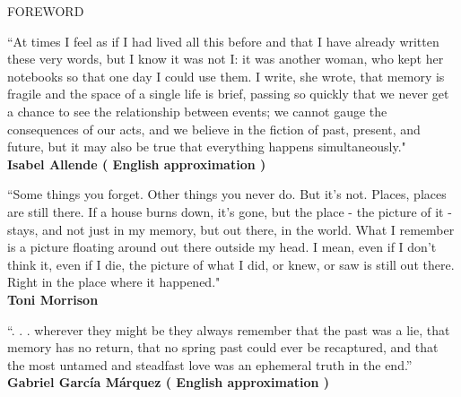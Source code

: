 \documentclass[11pt]{article}
\begin{document}
\vspace*{5\baselineskip}

\begingroup
\begin{center}
\huge FOREWORD
\end{center}
\endgroup

\vspace*{2\baselineskip}

\begingroup
\begin{center}
``At times I feel as if I had lived all this before and that I have already written these very words, but I know it was not I: it was another woman, who kept her notebooks so that one day I could use them. I write, she wrote, that memory is fragile and the space of a single life is brief, passing so quickly that we never get a chance to see the relationship between events; we cannot gauge the consequences of our acts, and we believe in the fiction of past, present, and future, but it may also be true that everything happens simultaneously." \\ \textbf{Isabel Allende ( English approximation )}
\end{center}
\endgroup

\begingroup
\begin{center}
``Some things you forget. Other things you never do. But it's not. Places, places are still there. If a house burns down, it's gone, but the place - the picture of it - stays, and not just in my memory, but out there, in the world. What I remember is a picture floating around out there outside my head. I mean, even if I don't think it, even if I die, the picture of what I did, or knew, or saw is still out there. Right in the place where it happened." \\ \textbf{Toni Morrison}
\end{center}
\endgroup

\begingroup
\begin{center}
``. . . wherever they might be they always remember that the past was a lie, that memory has no return, that no spring past could ever be recaptured, and that the most untamed and steadfast love was an ephemeral truth in the end.'' \\ \textbf{Gabriel García Márquez ( English approximation )}
\end{center}
\endgroup
\end{document}
